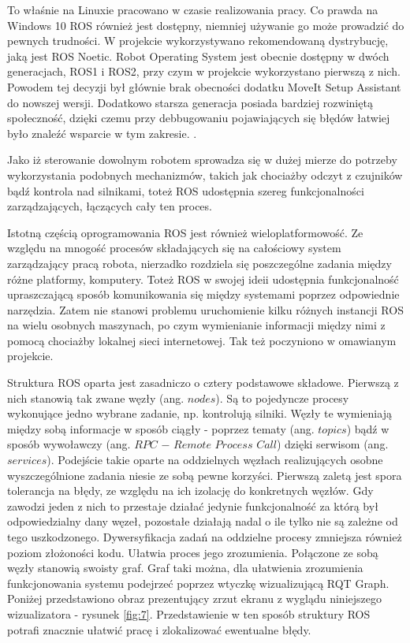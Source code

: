 To właśnie na Linuxie pracowano w czasie realizowania pracy. Co prawda na Windows 10 ROS również jest dostępny, niemniej używanie go może prowadzić do pewnych trudności.  W projekcie wykorzystywano rekomendowaną dystrybucję, jaką jest ROS Noetic. Robot Operating System jest obecnie dostępny w dwóch generacjach, ROS1 i ROS2, przy czym w projekcie wykorzystano pierwszą z nich. Powodem tej decyzji był głównie brak obecności dodatku MoveIt Setup Assistant do nowszej wersji. Dodatkowo starsza generacja posiada bardziej rozwiniętą społeczność, dzięki czemu przy debbugowaniu pojawiających się błędów łatwiej było znaleźć wsparcie w tym zakresie. \cite{ROSDoc}.

Jako iż sterowanie dowolnym robotem sprowadza się w dużej mierze do potrzeby wykorzystania podobnych mechanizmów, takich jak chociażby odczyt z czujników bądź kontrola nad silnikami, toteż ROS udostępnia szereg funkcjonalności zarządzających, łączących cały ten proces.

Istotną częścią oprogramowania ROS jest również wieloplatformowość. Ze względu na mnogość procesów składających się na całościowy system zarządzający pracą robota, nierzadko rozdziela się poszczególne zadania między różne platformy, komputery. Toteż ROS w swojej ideii udostępnia funkcjonalność upraszczającą sposób komunikowania się między systemami poprzez odpowiednie narzędzia. Zatem nie stanowi problemu uruchomienie kilku różnych instancji ROS na wielu osobnych maszynach, po czym wymienianie informacji między nimi z pomocą chociażby lokalnej sieci internetowej. Tak też poczyniono w omawianym projekcie.

Struktura ROS oparta jest zasadniczo o cztery podstawowe składowe. Pierwszą z nich stanowią tak zwane węzły (ang. $nodes$). Są to pojedyncze procesy wykonujące jedno wybrane zadanie, np. kontrolują silniki. Węzły te wymieniają między sobą informacje w sposób ciągły - poprzez tematy (ang. $topics$) bądź w sposób wywoławczy (ang. $RPC$ $-$ $Remote$ $Process$ $Call$) dzięki serwisom (ang. $services$). Podejście takie oparte na oddzielnych węzłach realizujących osobne wyszczególnione zadania niesie ze sobą pewne korzyści. Pierwszą zaletą jest spora tolerancja na błędy, ze względu na ich izolację do konkretnych węzłów. Gdy zawodzi jeden z nich to przestaje działać jedynie funkcjonalność za którą był odpowiedzialny dany węzeł, pozostałe działają nadal o ile tylko nie są zależne od tego uszkodzonego. Dywersyfikacja zadań na oddzielne procesy zmniejsza również poziom złożoności kodu. Ułatwia proces jego zrozumienia. Połączone ze sobą węzły stanowią swoisty graf. Graf taki można, dla ułatwienia zrozumienia funkcjonowania systemu podejrzeć poprzez wtyczkę wizualizującą RQT Graph. Poniżej przedstawiono obraz prezentujący zrzut ekranu z wyglądu niniejszego wizualizatora - rysunek \ref{fig:7}. Przedstawienie w ten sposób struktury ROS potrafi znacznie ułatwić pracę i zlokalizować ewentualne błędy. \cite{Nodes}

